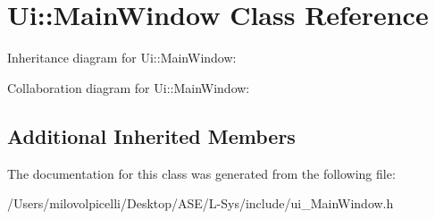 \hypertarget{class_ui_1_1_main_window}{}\section{Ui\+:\+:Main\+Window Class Reference}
\label{class_ui_1_1_main_window}


Inheritance diagram for Ui\+:\+:Main\+Window\+:


Collaboration diagram for Ui\+:\+:Main\+Window\+:
\subsection*{Additional Inherited Members}


The documentation for this class was generated from the following file\+:\begin{DoxyCompactItemize}
\item 
/\+Users/milovolpicelli/\+Desktop/\+A\+S\+E/\+L-\/\+Sys/include/ui\+\_\+\+Main\+Window.\+h\end{DoxyCompactItemize}
